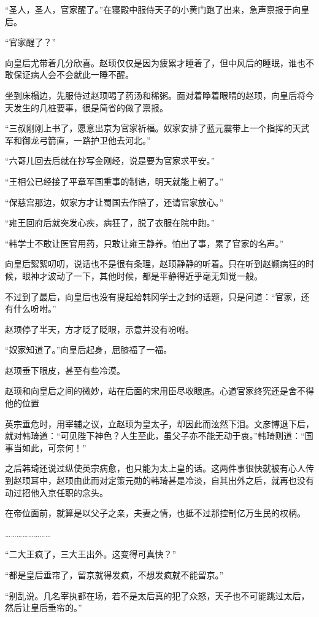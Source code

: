 “圣人，圣人，官家醒了。”在寝殿中服侍天子的小黄门跑了出来，急声禀报于向皇后。 

“官家醒了？” 

向皇后尤带着几分欣喜。赵顼仅仅是因为疲累才睡着了，但中风后的睡眠，谁也不敢保证病人会不会就此一睡不醒。 

坐到床榻边，先服侍过赵顼喝了药汤和稀粥。面对着睁着眼睛的赵顼，向皇后将今天发生的几桩要事，很是简省的做了禀报。 

“三叔刚刚上书了，愿意出京为官家祈福。奴家安排了蓝元震带上一个指挥的天武军和御龙弓箭直，一路护卫他去河北。” 

“六哥儿回去后就在抄写金刚经，说是要为官家求平安。” 

“王相公已经接了平章军国重事的制诰，明天就能上朝了。” 

“保慈宫那边，奴家方才让蜀国去作陪了，还请官家放心。” 

“雍王回府后就突发心疾，病狂了，脱了衣服在院中跑。” 

“韩学士不敢让医官用药，只敢让雍王静养。怕出了事，累了官家的名声。” 

向皇后絮絮叨叨，说话也不是很有条理，赵顼静静的听着。只在听到赵颢病狂的时候，眼神才波动了一下，其他时候，都是平静得近乎毫无知觉一般。 

不过到了最后，向皇后也没有提起给韩冈学士之封的话题，只是问道：“官家，还有什么吩咐。” 

赵顼停了半天，方才眨了眨眼，示意并没有吩咐。 

“奴家知道了。”向皇后起身，屈膝福了一福。 

赵顼垂下眼皮，甚至有些冷漠。 

赵顼和向皇后之间的微妙，站在后面的宋用臣尽收眼底。心道官家终究还是舍不得他的位置

英宗垂危时，用宰辅之议，立赵顼为皇太子，却因此而泫然下泪。文彦博退下后，就对韩琦道：“可见陛下神色？人生至此，虽父子亦不能无动于衷。”韩琦则道：“国事当如此，可奈何！” 

之后韩琦还说过纵使英宗病愈，也只能为太上皇的话。这两件事很快就被有心人传到赵顼耳中，赵顼由此而对定策元勋的韩琦甚是冷淡，自其出外之后，就再也没有动过招他入京任职的念头。 

在帝位面前，就算是以父子之亲，夫妻之情，也抵不过那控制亿万生民的权柄。 

…………………… 

“二大王疯了，三大王出外。这变得可真快？” 

“都是皇后垂帘了，留京就得发疯，不想发疯就不能留京。” 

“别乱说。几名宰执都在场，若不是太后真的犯了众怒，天子也不可能跳过太后，然后让皇后垂帘的。” 

